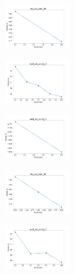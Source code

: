 \begin{figure}[H]    
    \centering
    \begin{subfigure}
        \centering
        \includegraphics[width=0.32\textwidth]{img/copkm2/iris_set_const_20_949004259_time.png}
    \end{subfigure}
    \hfill
    \begin{subfigure}
        \centering
        \includegraphics[width=0.32\textwidth]{img/copkm2/ecoli_set_const_20_949004259_time.png}
    \end{subfigure}
    \hfill
    \begin{subfigure}
        \centering
        \includegraphics[width=0.32\textwidth]{img/copkm2/rand_set_const_20_949004259_time.png}
    \end{subfigure}
    \hfill
    \begin{subfigure}
        \centering
        \includegraphics[width=0.32\textwidth]{img/copkm2/iris_set_const_20_589741062_time.png}
    \end{subfigure}
    \hfill
    \begin{subfigure}
        \centering
        \includegraphics[width=0.32\textwidth]{img/copkm2/ecoli_set_const_20_589741062_time.png}

\end{subfigure}
\end{figure}
